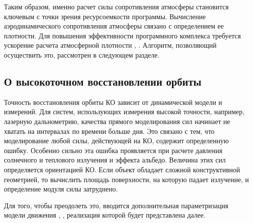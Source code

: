 Таким образом, именно расчет силы 
сопротивления атмосферы становится ключевым с точки зрения ресурсоемкости программы.
Вычисление аэродинамического сопротивления атмосферы связано 
с определением ее плотности.
Для повышения эффективности программного комплекса требуется ускорение расчета атмосферной плотности
\cite{Fukin2023}, \cite{Khripunov2024}.
Алгоритм, позволяющий осуществить это, рассмотрен в следующем разделе.

\subsection{О высокоточном восстановлении орбиты}
Точность восстановления орбиты КО зависит от динамической модели и измерений.
Для систем, использующих измерения высокой точности, например, лазерную дальнометрию,
качества прямого моделирования сил начинает не хватать на интервалах по времени
больше дня. Это связано с тем, что моделирование
любой силы, действующей на КО, содержит определенную ошибку. Особенно сильно эта ошибка
проявляется при расчете давления солнечного и теплового излучения и эффекта альбедо. 
Величина этих сил определяется ориентацией КО. Если объект обладает сложной конструктивной геометрией,
то вычислить площадь поверхности, на которую падает излучение, и определение модуля силы затруднено. 

Для того, чтобы преодолеть это, вводится дополнительная параметризация модели движения
\cite{GeowissenschaftlicheMitteilungen}, \cite{Jaggi2006},
реализация которой будет представлена далее.